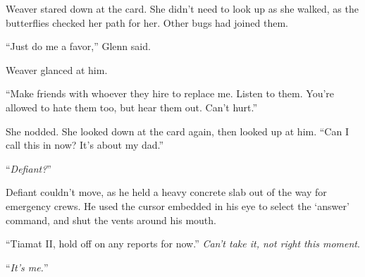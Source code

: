 Weaver stared down at the card.  She didn't need to look up as she walked, as the butterflies checked her path for her.  Other bugs had joined them.



``Just do me a favor,'' Glenn said.



Weaver glanced at him.



``Make friends with whoever they hire to replace me.  Listen to them.  You're allowed to hate them too, but hear them out.  Can't hurt.''



She nodded.  She looked down at the card again, then looked up at him.  ``Can I call this in now?  It's about my dad.''



\blacksquare



``\emph{Defiant?}''



Defiant couldn't move, as he held a heavy concrete slab out of the way for emergency crews.  He used the cursor embedded in his eye to select the `answer' command, and shut the vents around his mouth.



``Tiamat II, hold off on any reports for now.'' \emph{Can't take it, not right this moment}.



``\emph{It's me.}''





